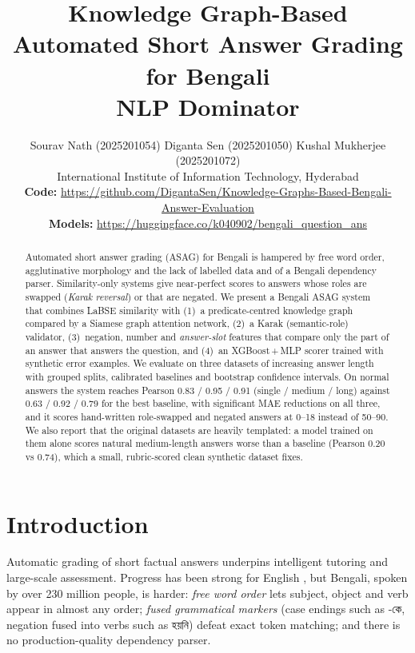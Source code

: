 \documentclass[10pt,a4paper,twocolumn]{article}
\title{\vspace{-1.2cm}\textbf{Knowledge Graph-Based Automated Short Answer Grading for Bengali}\\[2pt]
\large NLP Dominator}
\author{Sourav Nath (2025201054) \quad Diganta Sen (2025201050) \quad Kushal Mukherjee (2025201072)\\[2pt]
International Institute of Information Technology, Hyderabad\\[2pt]
\small\textbf{Code:} \url{https://github.com/DigantaSen/Knowledge-Graphs-Based-Bengali-Answer-Evaluation}\\
\small\textbf{Models:} \url{https://huggingface.co/k040902/bengali_question_ans}}
\date{}
\newcommand{\bn}[1]{{\bengalifont #1}}
\begin{document}
\maketitle

\begin{abstract}
Automated short answer grading (ASAG) for Bengali is hampered by free word
order, agglutinative morphology and the lack of labelled data and of a
Bengali dependency parser. Similarity-only systems give near-perfect scores
to answers whose roles are swapped (\emph{Karak reversal}) or that are
negated. We present a Bengali ASAG system that combines LaBSE similarity with
(1)~a predicate-centred knowledge graph compared by a Siamese graph attention
network, (2)~a Karak (semantic-role) validator, (3)~negation, number and
\emph{answer-slot} features that compare only the part of an answer that
answers the question, and (4)~an XGBoost\,+\,MLP scorer trained with
synthetic error examples. We evaluate on three datasets of increasing answer
length with grouped splits, calibrated baselines and bootstrap confidence
intervals. On normal answers the system reaches Pearson 0.83 / 0.95 / 0.91
(single / medium / long) against 0.63 / 0.92 / 0.79 for the best baseline,
with significant MAE reductions on all three, and it scores hand-written
role-swapped and negated answers at 0--18 instead of 50--90. We also report
that the original datasets are heavily templated: a model trained on them
alone scores natural medium-length answers worse than a baseline (Pearson
0.20 vs 0.74), which a small, rubric-scored clean synthetic dataset fixes.
\end{abstract}

\section{Introduction}
Automatic grading of short factual answers underpins intelligent tutoring and
large-scale assessment. Progress has been strong for English
\citep{mohler2011,sultan2016,riordan2017}, but Bengali, spoken by over 230
million people, is harder: \emph{free word order} lets subject, object and
verb appear in almost any order; \emph{fused grammatical markers} (case
endings such as \bn{-কে}, negation fused into verbs such as \bn{হয়নি}) defeat
exact token matching; and there is no production-quality dependency parser.
\end{document}
